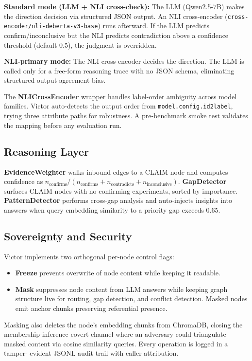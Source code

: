 \documentclass[letterpaper]{article}          %
\theoremstyle{plain}
\theoremstyle{definition}
\theoremstyle{remark}
\begin{document}
\textbf{Standard mode (LLM + NLI cross-check):} The LLM (Qwen2.5-7B) makes the
direction decision via structured JSON output. An NLI cross-encoder
(\texttt{cross-encoder/nli-deberta-v3-base}) runs afterward. If the LLM predicts
confirm/inconclusive but the NLI predicts contradiction above a confidence
threshold (default 0.5), the judgment is overridden.

\textbf{NLI-primary mode:} The NLI cross-encoder decides the direction. The LLM
is called only for a free-form reasoning trace with no JSON schema, eliminating
structured-output agreement bias.

The \textbf{NLICrossEncoder} wrapper handles label-order ambiguity across model
families. Victor auto-detects the output order from \texttt{model.config.id2label},
trying three attribute paths for robustness. A pre-benchmark smoke test validates
the mapping before any evaluation run.

\subsection{Reasoning Layer}

\textbf{EvidenceWeighter} walks inbound edges to a CLAIM node and computes
confidence as $n_{\text{confirms}} / (n_{\text{confirms}} + n_{\text{contradicts}} +
n_{\text{inconclusive}})$. \textbf{GapDetector} surfaces CLAIM nodes with no
confirming experiments, sorted by importance. \textbf{PatternDetector} performs
cross-gap analysis and auto-injects insights into answers when query embedding
similarity to a priority gap exceeds 0.65.

\subsection{Sovereignty and Security}

Victor implements two orthogonal per-node control flags:

\begin{itemize}
    \item \textbf{Freeze} prevents overwrite of node content while keeping it
    readable.
    \item \textbf{Mask} suppresses node content from LLM answers while keeping
    graph structure live for routing, gap detection, and conflict detection.
    Masked nodes emit anchor chunks preserving referential presence.
\end{itemize}

Masking also deletes the node's embedding chunks from ChromaDB, closing the
membership-inference covert channel where an adversary could triangulate masked
content via cosine similarity queries. Every operation is logged in a tamper-
evident JSONL audit trail with caller attribution.
\end{document}
